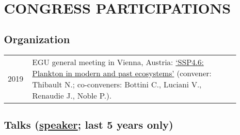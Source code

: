 \documentclass[11pt, a4paper]{article}
\begin{document}
\section{CONGRESS PARTICIPATIONS}
\subsection{Organization}
\begin{longtable}{p{0.1\linewidth} P{0.85\linewidth}}
2019 & EGU general meeting in Vienna, Austria: \href{https://meetingorganizer.copernicus.org/EGU2019/session/31041}{`SSP4.6: Plankton in modern and past ecosystems'} (convener: Thibault N.; co-conveners: Bottini C., Luciani V., Renaudie J., Noble P.).
\end{longtable}
\subsection[Talks]{Talks \textnormal{\footnotesize{(\underline{speaker}; last 5 years only)}}}
\end{document}
